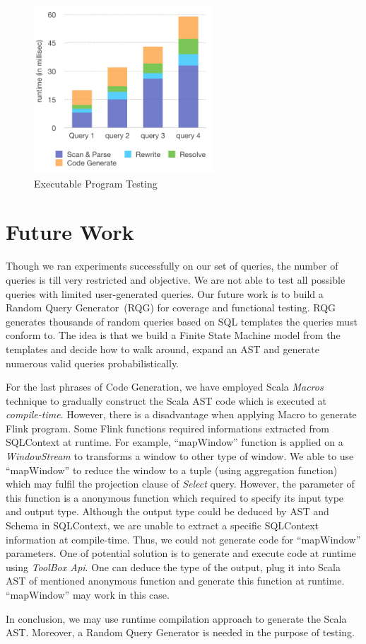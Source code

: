 \begin{figure}[h!] 
\centering    
\includegraphics[width=0.6\textwidth]{ExecutableProgram}
\caption{Executable Program Testing}
\label{fig:ExecutableProgram}
\end{figure}

\section{Future Work}

Though we ran experiments successfully on our set of queries, the number of queries is till very restricted and objective. We are not able to test all possible queries with limited user-generated queries. Our future work is to build a Random Query Generator~(RQG) for coverage and functional testing. RQG generates thousands of random queries based on SQL templates the queries must conform to. The idea is that we build a Finite State Machine model from the templates and decide how to walk around, expand an AST and generate numerous valid queries  probabilistically. 

For the last phrases of Code Generation, we have employed Scala \textit{Macros} technique to gradually construct the Scala AST code which is executed at \textit{compile-time}. However, there is a disadvantage 
when applying Macro to generate Flink program. Some  Flink functions required informations extracted from SQLContext at runtime. For example, ``mapWindow'' function is applied on a \textit{WindowStream} to  transforms a window to other type of window. We able to use ``mapWindow'' to reduce the window to a tuple (using aggregation function) which may fulfil the projection clause of \textit{Select} query. However, the parameter of this function is a anonymous function which required  to specify its input type and output type. Although the output type could be deduced by AST and Schema in SQLContext, we are unable to extract a specific SQLContext information at compile-time. Thus, we could not generate code for ``mapWindow'' parameters. One of potential solution is to generate and execute code at runtime using \textit{ToolBox Api}. One can deduce the type of the output, plug it into Scala AST of mentioned anonymous function and generate this function at runtime. ``mapWindow'' may work in this case. 

In conclusion, we may use runtime compilation approach to generate the Scala AST. Moreover, a Random Query Generator is needed in the purpose of testing.

